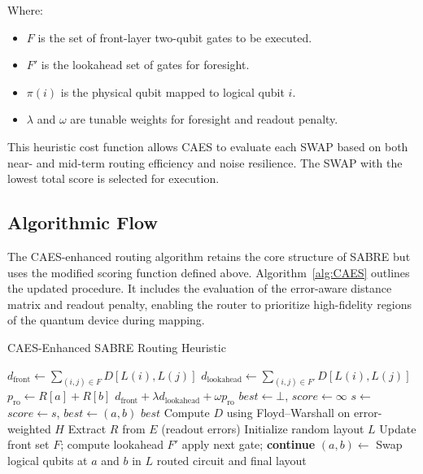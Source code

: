 \documentclass[conference]{IEEEtran}
\begin{document}
Where:
\begin{itemize}
    \item $F$ is the set of front-layer two-qubit gates to be executed.
    \item $F'$ is the lookahead set of gates for foresight.
    \item $\pi(i)$ is the physical qubit mapped to logical qubit $i$.
    \item $\lambda$ and $\omega$ are tunable weights for foresight and readout penalty.
\end{itemize}

This heuristic cost function allows CAES to evaluate each SWAP based on both near- and mid-term routing efficiency and noise resilience. The SWAP with the lowest total score is selected for execution.

\subsection{Algorithmic Flow}

The CAES-enhanced routing algorithm retains the core structure of SABRE but uses the modified scoring function defined above. Algorithm~\ref{alg:CAES} outlines the updated procedure. It includes the evaluation of the error-aware distance matrix and readout penalty, enabling the router to prioritize high-fidelity regions of the quantum device during mapping.

\begin{algorithm}[t]
\caption{CAES-Enhanced SABRE Routing Heuristic}
\label{alg:CAES}
\begin{algorithmic}[1]
  \State $d_{\text{front}} \gets \sum_{(i,j) \in F} D[L(i), L(j)]$
  \State $d_{\text{lookahead}} \gets \sum_{(i,j) \in F'} D[L(i), L(j)]$
  \State $p_{\text{ro}} \gets R[a] + R[b]$
  \State \Return $d_{\text{front}} + \lambda d_{\text{lookahead}} + \omega p_{\text{ro}}$
\EndFunction
{}
  \State $best \gets \bot$, $score \gets \infty$
    \State $s \gets$ 
      \State $score \gets s$, $best \gets (a, b)$
    \EndIf
  \EndFor
  \State \Return $best$
\EndFunction
{}
  \State Compute $D$ using Floyd–Warshall on error-weighted $H$
  \State Extract $R$ from $E$ (readout errors)
  \State Initialize random layout $L$
    \State Update front set $F$; compute lookahead $F'$
     apply next gate; \textbf{continue}
    \EndIf
    \State $(a,b) \gets$ 
    \State Swap logical qubits at $a$ and $b$ in $L$
  \EndWhile
  \State \Return routed circuit and final layout
\EndFunction
\end{algorithmic}
\end{algorithm}
\end{document}
